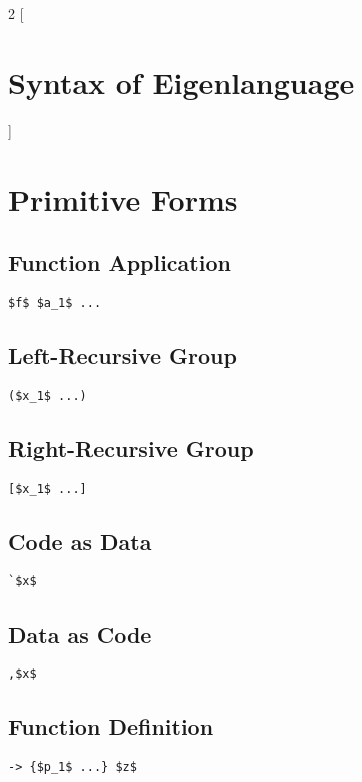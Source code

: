 \documentclass{article}
\begin{document}
\begin{multicols} 2
[\section*{\huge Syntax of Eigenlanguage}]

\section*{Primitive Forms}

\subsection*{Function Application}
\begin{lstlisting}[mathescape]
$f$ $a_1$ ...
\end{lstlisting}

\subsection*{Left-Recursive Group}
\begin{lstlisting}[mathescape]
($x_1$ ...)
\end{lstlisting}

\subsection*{Right-Recursive Group}
\begin{lstlisting}[mathescape]
[$x_1$ ...]
\end{lstlisting}

\subsection*{Code as Data}
\begin{lstlisting}[mathescape]
`$x$
\end{lstlisting}

\subsection*{Data as Code}
\begin{lstlisting}[mathescape]
,$x$
\end{lstlisting}

\subsection*{Function Definition}
\begin{lstlisting}[mathescape]
-> {$p_1$ ...} $z$
\end{lstlisting}


\end{multicols}
\end{document}
